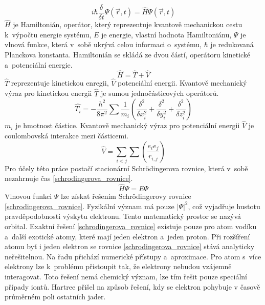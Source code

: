 \documentclass[
  printed, %
  table,   %
  lof,     %
  lot,     %
  oneside,
]{fithesis3}
\begin{document}
\begin{equation}
i \hbar \frac{\delta}{\delta t} \Psi (\vec{r},t)=\widehat{H} \Psi(\vec{r},t)
\label{SCH_time_dependent}
\end{equation}
$\widehat{H}$ je Hamiltonián, operátor, který reprezentuje kvantově mechanickou cestu k~výpočtu energie systému, $E$ je energie, vlastní hodnota Hamiltoniánu, $\Psi$ je vlnová funkce, která v~sobě ukrývá celou informaci o~systému, $\hbar$ je redukovaná Planckova konstanta. Hamiltonián se skládá ze dvou částí, operátoru kinetické a~potenciální energie.
\begin{equation}
\widehat{H} = \widehat{T} + \widehat{V}
\end{equation}
$\widehat{T}$ reprezentuje kinetickou enregii, $\widehat{V}$ potenciální energii. Kvantově mechanický výraz pro kinetickou energii $\widehat{T}$ je sumou jednočásticových operátorů. 
\begin{equation}
\widehat{T_i} = - \frac{h^2}{8 \pi ^2} \sum \frac{1}{m_i} \left( \frac{\delta^2}{\delta x_i^2} +\frac{\delta^2}{\delta y_i^2} +\frac{\delta^2}{\delta z_i^2} \right)
\end{equation}
$m_i$ je hmotnost částice. Kvantově mechanický výraz pro potenciální energii $\widehat{V}$ je coulombovská interakce mezi částicemi.
\begin{equation}
\widehat{V} = \sum_{i<j}\sum \left( \frac{e_i e_j}{r_{i,j}}\right)
\end{equation}
 Pro účely této práce postačí stacionární Schrödingerova rovnice, která v~sobě nezahrnuje čas \ref{schrodingerova_rovnice}.\\
 \begin{equation}
\widehat{H}\Psi = E \Psi
\label{schrodingerova_rovnice}
\end{equation}
Vlnovou funkci $\Psi$ lze získat řešením Schrödingerovy rovnice \ref{schrodingerova_rovnice}. Fyzikální význam má pouze $|\Psi|^2$, což vyjadřuje hustotu pravděpodobnosti výskytu elektronu. Tento matematický prostor se nazývá orbital. Exaktní řešení \ref{schrodingerova_rovnice} existuje pouze pro atom vodíku a~další exotické atomy, které mají jeden elektron a~jeden proton. Při rozšíření atomu byť i jeden elektron se rovnice \ref{schrodingerova_rovnice} stává analyticky neřešitelnou. Na řadu přichází numerické přístupy a~aproximace. Pro atom s~více elektrony lze k~problému přistoupit tak, že elektrony nebudou vzájemně interagovat. Toto řešení nemá chemický význam, lze tím řešit pouze speciální případy iontů. Hartree přišel na způsob řešení, kdy se elektron pohybuje v časově průměrném poli ostatních jader. \cite{warren1986ab}
\end{document}
